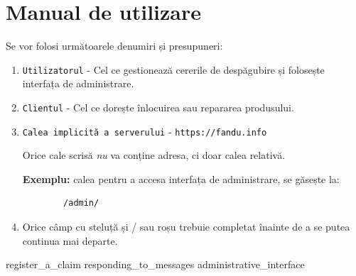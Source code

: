 \chapter{Manual de utilizare}

	Se vor folosi următoarele denumiri și presupuneri:

	\begin{enumerate}
		\item \verb|Utilizatorul| - Cel ce gestionează cererile de despăgubire și folosește interfața de administrare.
		\item \verb|Clientul| - Cel ce dorește înlocuirea sau repararea produsului.
		\item \verb|Calea implicită a serverului| - \verb|https://fandu.info|

			Orice cale scrisă \textit{nu} va conține adresa, ci doar calea relativă.

			\textbf{Exemplu:} calea pentru a accesa interfața de administrare, se găsește la:
\begin{Verbatim}
		/admin/
\end{Verbatim}
		\item Orice câmp cu steluță și / sau roșu trebuie completat înainte de a se putea continua mai departe.

	\end{enumerate}


	{register_a_claim}
	{responding_to_messages}
	{administrative_interface}



